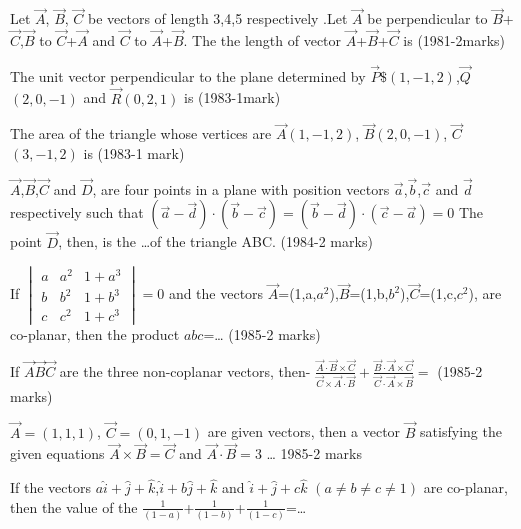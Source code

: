 
\iffalse
  \title{Vector-Algebra}
  \author{KOTHAPALLI AKHIL}
  \section{fitb}
\fi
    \item Let $\Vec{A}$, $\vec{B}$, $\vec{C}$ be vectors of length 3,4,5 respectively .Let $\vec{A}$ be perpendicular to $\vec{B}$+$\vec{C}$,$\vec{B}$ to $\vec{C}$+$\vec{A}$ and $\vec{C}$ to $\vec{A}$+$\vec{B}$. The the length of vector $\vec{A}$+$\vec{B}$+$\vec{C}$ is
    \hfill{(1981-2marks)}
    \item The unit vector perpendicular to the plane determined by $\vec{P}$$\$(1,-1,2)$,$\vec{Q}$$(2,0,-1)$ and $\vec{R}$$(0,2,1)$ is
    \hfill{(1983-1mark)}
    \item The area of the triangle whose vertices are $\vec{A}$$(1,-1,2)$, $\vec{B}$$(2,0,-1)$, $\vec{C}$$(3,-1,2)$ is
    \hfill{(1983-1 mark)}
    \item $\vec{A}$,$\vec{B}$,$\vec{C}$ and $\vec{D}$, are four points in a plane with position vectors $\vec{a}$,$\vec{b}$,$\vec{c}$ and $\vec{d}$ respectively such that $(\vec{a}-\vec{d})\cdot(\vec{b}-\vec{c})=(\vec{b}-\vec{d})\cdot(\vec{c}-\vec{a})=0$
    The point $\vec{D}$, then, is the \dots of the triangle ABC.
    \hfill{(1984-2 marks)}
    \item If $ 
 \begin{vmatrix}
a & a^2 & 1+a^3\\
b & b^2 & 1+b^3\\
c & c^2 & 1+c^3
\end{vmatrix}
=0$ and the vectors $\vec{A}$=(1,a,$a^2$),$\vec{B}$=(1,b,$b^2$),$\vec{C}$=(1,c,$c^2$), are co-planar, then the product $abc$=\dots
\hfill{(1985-2 marks)}
\item If $\vec{A}$$\vec{B}$$\vec{C}$ are the three non-coplanar vectors, then- $\frac{\vec{A}\cdot\vec{B}\times\vec{C}}{\vec{C}\times\vec{A}\cdot\vec{B}}+\frac{\vec{B}\cdot\vec{A}\times\vec{C}}{\vec{C}\cdot\vec{A}\times\vec{B}}=$
\hfill{(1985-2 marks)}
\item $\vec{A}=(1,1,1)$, $\vec{C}=(0,1,-1)$ are given vectors, then a vector $\vec{B}$ satisfying the given equations $\vec{A}\times\vec{B}=\vec{C}$ and $\vec{A}\cdot\vec{B}=3$ \dots
\hfill{1985-2 marks}
\item If the vectors $a\hat{i}+\hat{j}+\hat{k}$,$\hat{i}+b\hat{j}+\hat{k}$ and $\hat{i}+\hat{j}+c\hat{k}$ $(a\neq b\neq c\neq 1)$ are co-planar, then the value of the $\frac{1}{(1-a)}$+$\frac{1}{(1-b)}$+$\frac{1}{(1-c)}$=\dots
